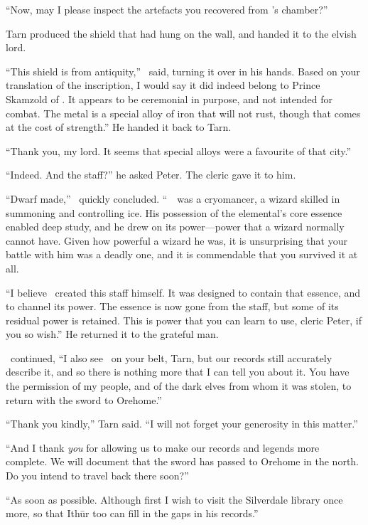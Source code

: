 ``Now, may I please inspect the artefacts you recovered from \mothzam's chamber?''

Tarn produced the shield that had hung on the wall, and handed it to the elvish lord.

``This shield is from antiquity,'' \arilor\ said, turning it over in his hands.  Based on your translation of the inscription, I would say it did indeed belong to Prince Skamzold of \atmudarant.  It appears to be ceremonial in purpose, and not intended for combat.  The metal is a special alloy of iron that will not rust, though that comes at the cost of strength.''  He handed it back to Tarn.

``Thank you, my lord.  It seems that special alloys were a favourite of that city.''

``Indeed.  And the staff?''  he asked Peter.  The cleric gave it to him.

``Dwarf made,'' \arilor\ quickly concluded.  ``\mothzam\ \driktur\ was a cryomancer, a wizard skilled in summoning and controlling ice.  His possession of the elemental's core essence enabled deep study, and he drew on its power---power that a wizard normally cannot have.  Given how powerful a wizard he was, it is unsurprising that your battle with him was a deadly one, and it is commendable that you survived it at all.

``I believe \mothzam\ created this staff himself.  It was designed to contain that essence, and to channel its power.  The essence is now gone from the staff, but some of its residual power is retained.  This is power that you can learn to use, cleric Peter, if you so wish.''  He returned it to the grateful man.

\arilor\ continued, ``I also see \kildir\ on your belt, Tarn, but our records still accurately describe it, and so there is nothing more that I can tell you about it.  You have the permission of my people, and of the dark elves from whom it was stolen, to return with the sword to Orehome.''

``Thank you kindly,'' Tarn said.  ``I will not forget your generosity in this matter.''

``And I thank \emph{you} for allowing us to make our records and legends more complete.  We will document that the sword has passed to Orehome in the north.  Do you intend to travel back there soon?''

``As soon as possible.  Although first I wish to visit the Silverdale library once more, so that Ith\=ur too can fill in the gaps in his records.''

